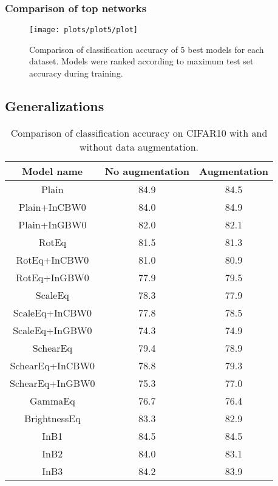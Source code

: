     \clearpage
    \subsubsection*{Comparison of top networks}

    \begin{figure}[h!]
        \centering
        \texttt{[image: plots/plot5/plot]}
        \caption{Comparison of classification accuracy of
            5 best models for each dataset.
            Models were ranked according to maximum test set accuracy during
            training.}
        \label{fig:plot5}
    \end{figure}

    \clearpage
    \subsection{Generalizations}
        \begin{table}
        \centering
        \begin{tabular}{|c|c|c|}
         \hline
         \textbf{Model name} & \textbf{No augmentation} &
         \textbf{Augmentation} \\
         \hline
            Plain & {84.9} & {84.5} \\
            Plain+InCBW0 & {84.0} & {84.9} \\
            Plain+InGBW0 & {82.0} & {82.1} \\
            RotEq & {81.5} & {81.3} \\
            RotEq+InCBW0 & {81.0} & {80.9} \\
            RotEq+InGBW0 & {77.9} & {79.5} \\
            ScaleEq & {78.3} & {77.9} \\
            ScaleEq+InCBW0 & {77.8} & {78.5} \\
            ScaleEq+InGBW0 & {74.3} & {74.9} \\
            SchearEq & {79.4} & {78.9} \\
            SchearEq+InCBW0 & {78.8} & {79.3} \\
            SchearEq+InGBW0 & {75.3} & {77.0} \\
            GammaEq & {76.7} & {76.4} \\
            BrightnessEq & {83.3} & {82.9} \\
            InB1 & {84.5} & {84.5} \\
            InB2 & {84.0} & {83.1} \\
            InB3 & {84.2} & {83.9} \\
         \hline
        \end{tabular}
        \caption{Comparison of classification accuracy on CIFAR10 with and without
            data augmentation.}
        \label{tab:jitter_table}
        \end{table}

